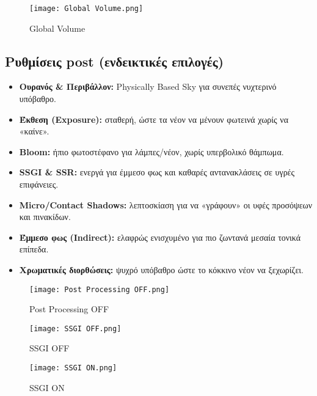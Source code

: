 \begin{figure}[H]
    \centering
    \texttt{[image: Global Volume.png]}
    \caption{Global Volume}
    \label{fig:placeholder}
\end{figure}

\subsection*{Ρυθμίσεις post (ενδεικτικές επιλογές)}
\begin{itemize}
  \item \textbf{Ουρανός \& Περιβάλλον:} Physically Based Sky για συνεπές νυχτερινό υπόβαθρο.
  \item \textbf{Έκθεση (Exposure):} σταθερή, ώστε τα νέον να μένουν φωτεινά χωρίς να «καίνε».
  \item \textbf{Bloom:} ήπιο φωτοστέφανο για λάμπες/νέον, χωρίς υπερβολικό θάμπωμα.
  \item \textbf{SSGI \& SSR:} ενεργά για έμμεσο φως και καθαρές αντανακλάσεις σε υγρές επιφάνειες.
  \item \textbf{Micro/Contact Shadows:} λεπτοσκίαση για να «γράφουν» οι υφές προσόψεων και πινακίδων.
  \item \textbf{Έμμεσο φως (Indirect):} ελαφρώς ενισχυμένο για πιο ζωντανά μεσαία τονικά επίπεδα.
  \item \textbf{Χρωματικές διορθώσεις:} ψυχρό υπόβαθρο ώστε το κόκκινο νέον να ξεχωρίζει.

\end{itemize}

\begin{figure}[H]
    \centering
    \texttt{[image: Post Processing OFF.png]}
    \caption{Post Processing OFF}
    \label{fig:placeholder}
\end{figure}
\begin{figure}[H]
    \centering
    \texttt{[image: SSGI OFF.png]}
    \caption{SSGI OFF}
    \label{fig:placeholder}
\end{figure}
\begin{figure}[H]
    \centering
    \texttt{[image: SSGI ON.png]}
    \caption{SSGI ON}
    \label{fig:placeholder}
\end{figure}
